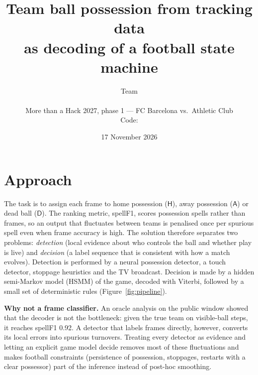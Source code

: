 \documentclass[10pt,a4paper]{article}
\title{\vspace{-1.2cm}\textbf{Team ball possession from tracking data\\ as decoding of a football state machine}}
\author{Team \team\\[2pt]\small \members\\[2pt]
\small More than a Hack 2027, phase 1 --- FC Barcelona vs.\ Athletic Club\\
\small Code: \repourl}
\date{\small 17 November 2026}
\newcommand{\lH}{\mathsf{H}}
\newcommand{\lA}{\mathsf{A}}
\newcommand{\lD}{\mathsf{D}}
\begin{document}
\maketitle
\vspace{-0.6cm}

\section{Approach}

The task is to assign each frame to home possession ($\lH$), away possession ($\lA$) or dead ball
($\lD$). The ranking metric, spellF1, scores possession spells rather than frames, so an output that
fluctuates between teams is penalised once per spurious spell even when frame accuracy is high. The
solution therefore separates two problems: \emph{detection} (local evidence about who controls the
ball and whether play is live) and \emph{decision} (a label sequence that is consistent with how a
match evolves). Detection is performed by a neural possession detector, a touch detector, stoppage
heuristics and the TV broadcast. Decision is made by a hidden semi-Markov model (HSMM) of the game,
decoded with Viterbi, followed by a small set of deterministic rules (Figure~\ref{fig:pipeline}).

\textbf{Why not a frame classifier.} An oracle analysis on the public window showed that the decoder
is not the bottleneck: given the true team on visible-ball steps, it reaches spellF1 0.92. A detector
that labels frames directly, however, converts its local errors into spurious turnovers. Treating
every detector as evidence and letting an explicit game model decide removes most of these
fluctuations and makes football constraints (persistence of possession, stoppages, restarts with a
clear possessor) part of the inference instead of post-hoc smoothing.
\end{document}
